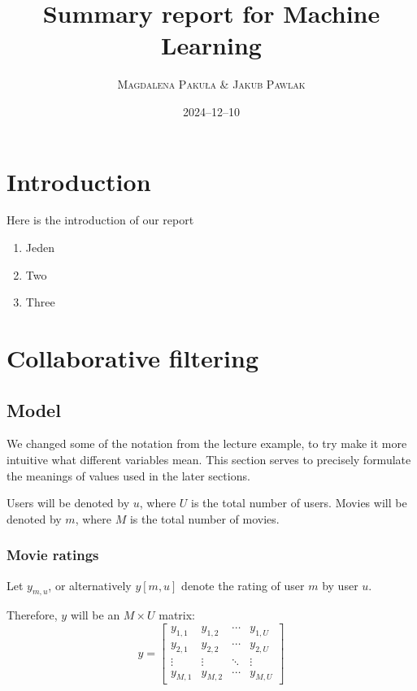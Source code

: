 \documentclass[12pt]{article}
\title{Summary report for Machine Learning}
\author{\textsc{Magdalena Pakuła} \& \textsc{Jakub Pawlak}}
\date{2024–12–10}
\begin{document}
\maketitle

\section{Introduction}

Here is the introduction of our report

\begin{enumerate}

	\item Jeden
	      
	\item Two
	      
	\item Three
	      
\end{enumerate}


\section{Collaborative filtering}



\subsection{Model}

We changed some of the notation from the lecture example, to try make it more intuitive what different variables mean.
This section serves to precisely formulate the meanings of values used in the later sections.

Users will be denoted by $u$, where $U$ is the total number of users.
Movies will be denoted by $m$, where $M$ is the total number of movies.

\subsubsection{Movie ratings}

Let $y_{m,u}$, or alternatively $y[m,u]$ denote the rating of user $m$ by user $u$.

Therefore, $y$ will be an $M \times U$ matrix:
$$ y =
	\begin{bmatrix}
		y_{1,1} & y_{1,2} & \cdots & y_{1,U} \\
		y_{2,1} & y_{2,2} & \cdots & y_{2,U} \\
		\vdots  & \vdots  & \ddots & \vdots  \\
		y_{M,1} & y_{M,2} & \cdots & y_{M,U}
	\end{bmatrix}
$$
\end{document}
